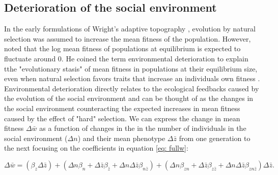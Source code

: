 \documentclass{article}
\begin{document}
\subsection{Deterioration of the social environment}
In the early formulations of Wright's adaptive topography \citep{Wright1931}, evolution by natural selection was assumed to increase the mean fitness of the population. However, \cite{Fisher1930} noted that the log mean fitness of populations at equilibrium is expected to fluctuate around 0. He coined the term environmental deterioration to explain tthe "evolutionary stasis" of mean fitness in populations at their equilibrium size, even when natural selection favors traits that increase an individuals own fitness \citep{Slatkin1991}. Environmental deterioration directly relates to the ecological feedbacks caused by the evolution of the social environment and can be thought of as the changes in the social environment counteracting the expected increases in mean fitness caused by the effect of "hard" selection. We can express the change in mean fitness $\Delta \bar{w}$ as a function of changes in the in the number of individuals in the social environment ($\Delta n$) and their mean phenotype $\Delta \bar{z}$ from one generation to the next focusing on the coefficients in equation \ref{eq: fullw}:  

\begin{equation} \label{eq: fisher}
\Delta \bar{w} =  (\beta_{z}\Delta \bar{z}) + (\Delta n\beta_{n} + \Delta \bar{z} \beta_{\bar{z}} + \Delta n \Delta \bar{z} \beta_{n\bar{z}}) + ( \Delta n  \beta_{zn} + \Delta \bar{z} \beta_{z\bar{z}} + \Delta n \Delta\bar{z} \beta_{zn\bar{z}})\Delta \bar{z}.
\end{equation}
\end{document}
